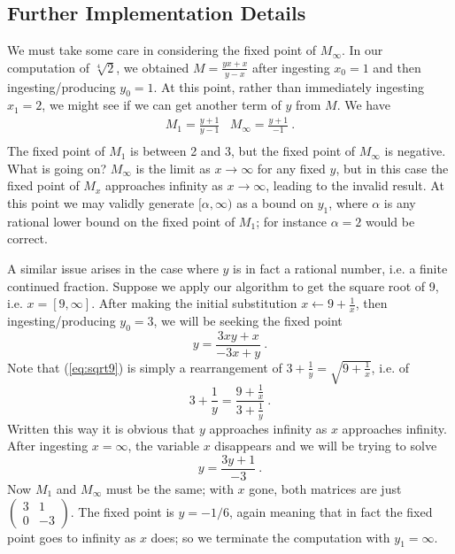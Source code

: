 \documentclass[11pt, oneside]{amsart}   	%
\begin{document}
\subsection{Further Implementation Details}\label{sec:rational}
We must take some care in considering the fixed point of $M_\infty$. In our computation of $\sqrt[4]{2}$, we obtained 
 $M=\frac{yx+x}{y-x}$ after ingesting $x_0=1$ and then ingesting/producing $y_0=1$.
 At this point, rather than immediately ingesting $x_1=2$, we might see if we can get another term of $y$ from $M$. We have
 \begin{equation*}
\begin{array}{cc}
M_1 = \frac{y+1}{y-1} & M_\infty = \frac{y+1}{-1}\ . \\
\end{array}
\end{equation*}
The fixed point of $M_1$ is between 2 and 3, but the fixed point of $M_\infty$ is negative. What is going on?
$M_\infty$ is the limit as $x \to \infty$ for any fixed $y$, but in this case the fixed point of $M_x$ approaches infinity as $x \to \infty$, leading to the invalid result.
At this point we may validly generate $[\alpha,\infty)$ as a bound on $y_1$, where $\alpha$ is any rational lower bound on the fixed point of $M_1$; for instance $\alpha = 2$ would be correct.
 
A similar issue arises in the case where $y$ is in fact a rational number,
i.e. a finite continued fraction. Suppose we apply our algorithm to get the square root of 9, i.e. $x = [9,\infty]$.
After making the initial substitution $x \leftarrow 9 + \frac{1}{x}$, then ingesting/producing $y_0=3$,
we will be seeking the fixed point
\begin{equation}\label{eq:sqrt9}
y = \frac{3xy+x}{-3x+y}\ .
\end{equation}
Note that (\ref{eq:sqrt9}) is simply a rearrangement of $3+\frac{1}{y} = \sqrt{9+\frac{1}{x}}$, i.e. of
\[
3+\frac{1}{y} = \frac{9+\frac{1}{x}}{3+\frac{1}{y}}\ .
\]
Written this way it is obvious that $y$ approaches infinity as $x$ approaches infinity. After ingesting $x=\infty$, the variable $x$ disappears and we will be trying to solve
\[
y = \frac{3y+1}{-3}\ .
\]
Now $M_1$ and $M_\infty$ must be the same; with $x$ gone, both matrices are just
$\left(
\begin{smallmatrix} 
3 & 1 \\ 
0 & -3 
\end{smallmatrix}
\right)$. The fixed point is $y=-1/6$, again meaning that in fact the fixed point goes to infinity as $x$ does; so we terminate the computation with $y_1 = \infty$.
\end{document}
